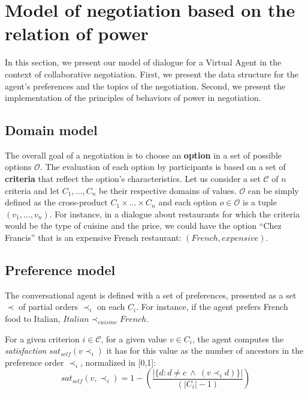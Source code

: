 \documentclass{llncs}
\begin{document}
		
		\section{Model of negotiation based on the relation of power}
		In this section, we present our model of dialogue for a Virtual Agent  in the context of collaborative negotiation.	
		First, we present the data structure for the agent's preferences and the topics of the negotiation. Second, we present the implementation of the principles of behaviors of power in negotiation.
		\vspace{-1em} 
		\subsection{Domain model}
		The overall goal of a negotiation is to choose an \textbf{option} in a set of possible options $\mathcal{O}$. The evaluation of each option by participants is based on a set of \textbf{criteria} that reflect the option's characteristics. Let us consider a set $\mathcal{C}$ of $n$ criteria and let $C_1,\ldots,C_n$ be their respective domains of values. $\mathcal{O}$ can be simply defined as the cross-product $C_1\times\ldots\times C_n$ and each option $o\in\mathcal{O}$ is a tuple $(v_1,\ldots,v_n)$. For instance, in a dialogue about restaurants for which the criteria would be the type of cuisine and the price, we could have the option ``Chez Francis'' that is an expensive French restaurant: $(French,expensive)$.
		
		\subsection{Preference model} 
		The conversational agent is defined with a set of preferences, presented as a set $\prec$ of partial orders $\prec_i$ on each $C_i$. For instance, if the agent prefers French food to Italian, $Italian\prec_{cuisine}French$.
		
		For a given criterion $i\in \mathcal{C}$, for a given value $v\in C_i$, the agent computes the \emph{satisfaction} $sat_{self}(v \prec_i)$ it has for this value as the number of ancestors in the preference order $\prec_i$, normalized in [0,1]:
		\vspace{-.5em} 
		\begin{equation}
		sat_{self}(v, \prec_i) =	1 - \left( \frac{|\{d : d \neq c \  \wedge \ (v \prec_i d)\}| }{( |C_i| - 1 )}\right)
		\end{equation}
		
\end{document}
